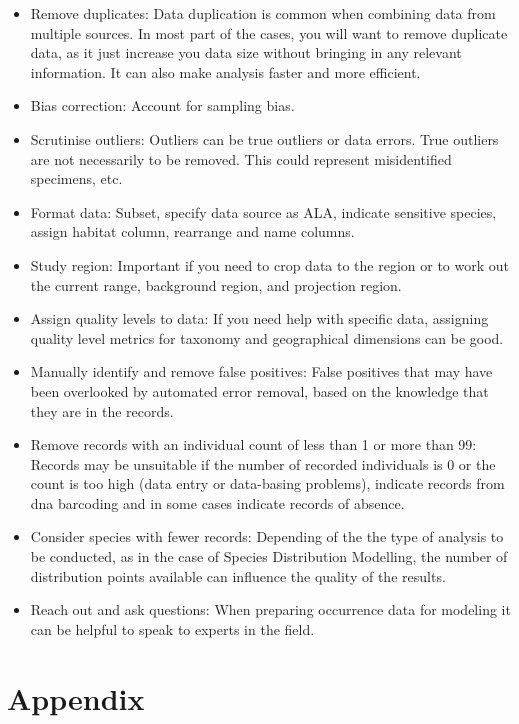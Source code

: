 \documentclass[
  letterpaper,
  DIV=11,
  numbers=noendperiod,
  oneside]{scrreprt}
\begin{document}
\begin{itemize}
\item
  Remove duplicates: Data duplication is common when combining data from
  multiple sources. In most part of the cases, you will want to remove
  duplicate data, as it just increase you data size without bringing in
  any relevant information. It can also make analysis faster and more
  efficient.
\item
  Bias correction: Account for sampling bias.
\item
  Scrutinise outliers: Outliers can be true outliers or data errors.
  True outliers are not necessarily to be removed. This could represent
  misidentified specimens, etc.
\item
  Format data: Subset, specify data source as ALA, indicate sensitive
  species, assign habitat column, rearrange and name columns.
\item
  Study region: Important if you need to crop data to the region or to
  work out the current range, background region, and projection region.
\item
  Assign quality levels to data: If you need help with specific data,
  assigning quality level metrics for taxonomy and geographical
  dimensions can be good.
\item
  Manually identify and remove false positives: False positives that may
  have been overlooked by automated error removal, based on the
  knowledge that they are in the records.
\item
  Remove records with an individual count of less than 1 or more than
  99: Records may be unsuitable if the number of recorded individuals is
  0 or the count is too high (data entry or data-basing problems),
  indicate records from dna barcoding and in some cases indicate records
  of absence.
\item
  Consider species with fewer records: Depending of the the type of
  analysis to be conducted, as in the case of Species Distribution
  Modelling, the number of distribution points available can influence
  the quality of the results.
\item
  Reach out and ask questions: When preparing occurrence data for
  modeling it can be helpful to speak to experts in the field.
\end{itemize}


\hypertarget{sec-appendix}{%
\chapter{Appendix}\label{sec-appendix}}
\end{document}
